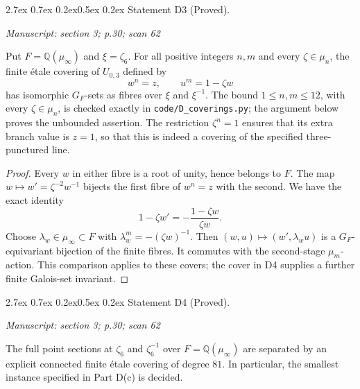 \documentclass[11pt,a4paper]{article}
\makeatletter
\newcommand{\passage}[1]{\par\smallskip\noindent\textit{Manuscript: #1}\par\smallskip}
\renewcommand\paragraph{\@startsection{paragraph}{4}{\z@}%
  {2.7ex \@plus 0.7ex \@minus 0.2ex}{0.5ex \@plus 0.2ex}%
  {\normalfont\normalsize\bfseries}}
\makeatother
\begin{document}
\paragraph{Statement D3 (Proved).}\label{res:D3}
\passage{section 3; p.30; scan 62}

Put $F=\mathbb Q(\mu_\infty)$ and $\xi=\zeta_6$.  For all positive
integers $n,m$ and every $\zeta\in\mu_n$, the finite \'etale covering of
$U_{0,3}$ defined by
\[
 w^n=z,\qquad u^m=1-\zeta w
\]
has isomorphic $G_F$-sets as fibres over $\xi$ and $\xi^{-1}$.
The bound $1\leq n,m\leq12$, with every $\zeta\in\mu_n$, is checked
exactly in \texttt{code/D\_coverings.py}; the argument below proves the
unbounded assertion.  The restriction $\zeta^n=1$ ensures that its extra
branch value is $z=1$, so that this is indeed a covering of the specified
three-punctured line.

\begin{proof}
Every $w$ in either fibre is a root of unity, hence belongs to $F$.
The map $w\mapsto w'=\zeta^{-2}w^{-1}$ bijects the first fibre of $w^n=z$
with the second.  We have the exact identity
\[
 1-\zeta w'=-\frac{1-\zeta w}{\zeta w}.
\]
Choose $\lambda_w\in\mu_\infty\subset F$ with
$\lambda_w^m=-(\zeta w)^{-1}$.  Then
$(w,u)\mapsto(w',\lambda_w u)$ is a $G_F$-equivariant bijection of the
finite fibres.  It commutes with the second-stage $\mu_m$-action.  This
comparison applies to these covers; the cover in D4 supplies a further
finite Galois-set invariant.
\end{proof}

\paragraph{Statement D4 (Proved).}\label{res:D4}
\passage{section 3; p.30; scan 62}

The full point sections at $\zeta_6$ and $\zeta_6^{-1}$ over
$F=\mathbb Q(\mu_\infty)$ are separated by an explicit connected finite
\'etale covering of degree $81$.  In particular, the smallest instance
specified in Part D(c) is decided.
\end{document}
